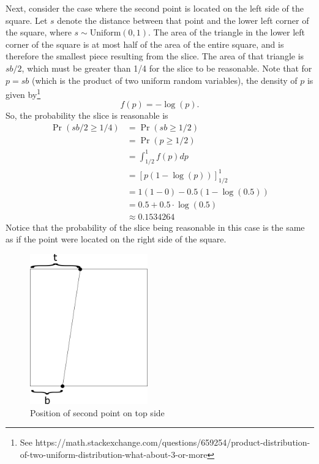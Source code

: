 \documentclass[12pt]{article}
\begin{document}
Next, consider the case where the second point is located on the left side of the square. Let $s$ denote the distance between that point and the lower left corner of the square, where $s\sim \mbox{Uniform}(0, 1)$. The area of the triangle in the lower left corner of the square is at most half of the area of the entire square, and is therefore the smallest piece resulting from the slice. The area of that triangle is $sb / 2$, which must be greater than 1/4 for the slice to be reasonable. Note that for $p = sb$ (which is the product of two uniform random variables), the density of $p$ is given by\footnote{See https://math.stackexchange.com/questions/659254/product-distribution-of-two-uniform-distribution-what-about-3-or-more}
\begin{equation}
	f(p) = -\log(p).
\end{equation}
So, the probability the slice is reasonable is
\begin{align}
	\nonumber
	\Pr(sb/2 \geq 1/4) &= \Pr(sb \geq 1/2)\\
	\nonumber	
	&= \Pr(p \geq 1/2)\\
	\nonumber
	&= \int_{1/2}^1 f(p) dp\\
	\nonumber
	&= \left[p(1 - \log(p))\right]_{1/2}^1\\
	\nonumber
	&= 1(1 - 0) - 0.5(1 - \log(0.5))\\
	\nonumber
	&= 0.5 + 0.5 \cdot \log(0.5)\\
	\nonumber
	&\approx 0.1534264
\end{align}
Notice that the probability of the slice being reasonable in this case is the same as if the point were located on the right side of the square.

\begin{figure}[!h]
	\centering
	\includegraphics[width=2in]{3.png}
	\caption{Position of second point on top side}
\end{figure}
\end{document}
